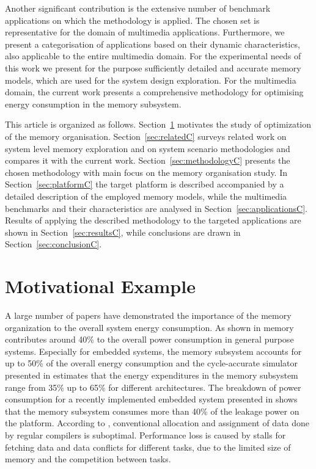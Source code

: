 Another significant contribution is the extensive number of benchmark applications on which the methodology is applied.
The chosen set is representative for the domain of multimedia applications.
Furthermore, we present a categorisation of applications based on their dynamic characteristics, also applicable to the entire multimedia domain. 
For the experimental needs of this work we present for the purpose sufficiently detailed and accurate  memory models, which are used for the system design exploration.
For the multimedia domain, the current work presents a comprehensive methodology for optimising energy consumption in the memory subsystem.

This article is organized as follows. 
Section~\ref{sec:motivationC} motivates the study of optimization of the memory organisation. 
Section~\ref{sec:relatedC} surveys related work on system level memory exploration and on system scenario methodologies and compares it with the current work. 
Section~\ref{sec:methodologyC} presents the chosen methodology with main focus on the memory organisation study. 
In Section~\ref{sec:platformC} the target platform is described accompanied by a detailed description of the employed memory models, while the multimedia benchmarks and their characteristics are analysed in Section~\ref{sec:applicationsC}. 
Results of applying the described methodology to the targeted applications are shown in Section~\ref{sec:resultsC}, while conclusions are drawn in Section~\ref{sec:conclusionC}. 

\section{Motivational Example}
\label{sec:motivationC}

A large number of papers have demonstrated the importance of the memory organization to the overall system energy consumption. 
As shown in \cite{Gonzalez1996} memory contributes around 40\% to the overall power consumption in general purpose systems. 
Especially for embedded systems, the memory subsystem accounts for up to 50\% of the overall energy consumption \cite{Che09} and the cycle-accurate simulator presented in \cite{Ben99} estimates that the energy expenditures in the memory subsystem range from 35\% up to 65\% for different architectures. 
The breakdown of power consumption for a recently implemented embedded system presented in \cite{Hul11} shows that the memory subsystem consumes more than 40\% of the leakage power on the platform. 
According to \cite{tcm}, conventional allocation and assignment of data done by regular compilers is suboptimal. 
Performance loss is caused by stalls for fetching data and data conflicts for different tasks, due to the limited size of memory and the competition between tasks. 

